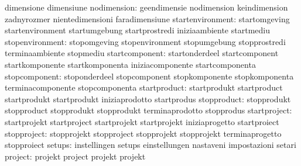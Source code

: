                                   dimensione                       dimensiune
                     nodimension: geendimensie                     nodimension
                                  keindimension                    zadnyrozmer
                                  nientedimensioni                 faradimensiune
                startenvironment: startomgeving                    startenvironment
                                  startumgebung                    startprostredi
                                  iniziaambiente                   startmediu
                 stopenvironment: stopomgeving                     stopenvironment
                                  stopumgebung                     stopprostredi
                                  terminaambiente                  stopmediu
                  startcomponent: startonderdeel                   startcomponent
                                  startkomponente                  startkomponenta
                                  iniziacomponente                 startcomponenta
                   stopcomponent: stoponderdeel                    stopcomponent
                                  stopkomponente                   stopkomponenta
                                  terminacomponente                stopcomponenta
                    startproduct: startprodukt                     startproduct
                                  startprodukt                     startprodukt
                                  iniziaprodotto                   startprodus
                     stopproduct: stopprodukt                      stopproduct
                                  stopprodukt                      stopprodukt
                                  terminaprodotto                  stopprodus
                    startproject: startprojekt                     startproject
                                  startprojekt                     startprojekt
                                  iniziaprogetto                   startproiect
                     stopproject: stopprojekt                      stopproject
                                  stopprojekt                      stopprojekt
                                  terminaprogetto                  stopproiect
                          setups: instellingen                     setups
                                  einstellungen                    nastaveni
                                  impostazioni                     setari
                         project: projekt                          project
                                  projekt                          projekt
